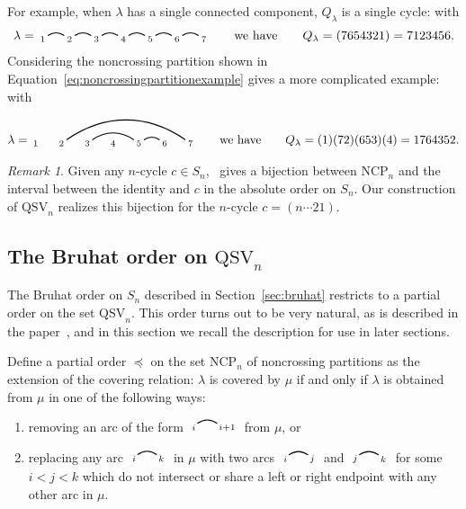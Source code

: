 \documentclass[submission]{FPSAC2024}
\theoremstyle{definition}
\theoremstyle{remark}
\newtheorem{rem}[equation]{Remark}
\numberwithin{equation}{section}
\newcommand{\QSV}{\mathrm{QSV}}
\newcommand{\NCP}{\mathrm{NCP}}
\newcommand{\edge}[2]{\tikz[scale = 0.75, baseline = -0.2cm]{
\draw (0.1, 0) node[inner sep = 0ex] (a) {};
\node[left, xshift = 0.1cm, yshift = -0.1cm] at (a) {$\scriptstyle #1$};
\draw (0.9, 0)  node[inner sep = 0ex] (b) {};
\node[right, xshift = -0.1cm, yshift = -0.1cm] at (b) {$\scriptstyle #2$};
\draw[thick] (a) to[out = 35, in = 145] (b);}}
\begin{document}
For example, when $\lambda$ has a single connected component, $Q_{\lambda}$ is a single cycle: with
\[
\lambda = \begin{tikzpicture}[scale = 0.75, baseline = 0.75*-0.2]
\foreach \x in {1, ..., 7}{\draw[fill] (\x - 1, 0) node[inner sep = 2pt] (\x) {$\scriptstyle \x$};}
\foreach \i\j in {1/2, 2/3, 3/4, 4/5, 5/6, 6/7}{\draw[thick] (\i) to[out = 35, in = 145] (\j);}
\end{tikzpicture}
\qquad\text{we have}\qquad
Q_{\lambda} = (7654321) = 7123456.
\]
Considering the noncrossing partition shown in Equation~\eqref{eq:noncrossingpartitionexample} gives a more complicated example: with
\[
\lambda = \begin{tikzpicture}[scale = 0.75, baseline = 0.75*-0.2]
\foreach \x in {1, ..., 7}{\draw[fill] (\x - 1, 0) node[inner sep = 2pt] (\x) {$\scriptstyle \x$};}
\foreach \i\j in {5/6, 3/5,2/7}{\draw[thick] (\i) to[out = 35, in = 145] (\j);}
\end{tikzpicture}
\qquad\text{we have}\qquad
Q_{\lambda} = (1)(72)(653)(4) = 1764352.
\]

\begin{rem}
\label{rem:QSVnoncrossing}
Given any $n$-cycle $c \in S_{n}$,~\cite{Baine} gives a bijection between $\NCP_{n}$ and the interval between the identity and $c$ in the absolute order on $S_{n}$.  Our construction of $\QSV_{n}$ realizes this bijection for the $n$-cycle $c = (n\cdots 21)$.  
\end{rem}

\subsection{The Bruhat order on $\QSV_{n}$}
\label{sec:bruhatballot}

The Bruhat order on $S_{n}$ described in Section~\ref{sec:bruhat} restricts to a partial order on the set $\QSV_{n}$.
This order turns out to be very natural, as is described in the paper~\cite{GW16}, and in this section we recall the description for use in later sections.

Define a partial order $\preceq$ on the set $\NCP_{n}$ of noncrossing partitions as the extension of the covering relation: $\lambda$ is covered by $\mu$ if and only if $\lambda$ is obtained from $\mu$ in one of the following ways:
\begin{enumerate}
\item removing an arc of the form $ \edge{i}{i+1}$ from $\mu$, or

\item replacing any arc $ \edge{i}{k}$ in $\mu$ with two arcs $ \edge{i}{j}$ and $ \edge{j}{k}$ for some $i < j < k$ which do not intersect or share a left or right endpoint with any other arc in $\mu$.

\end{enumerate}
\end{document}
